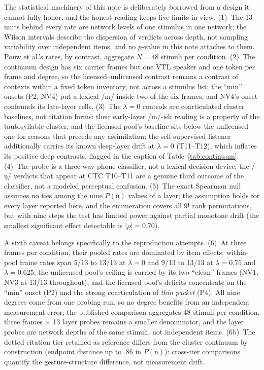 \documentclass[11pt,a4paper]{article}
\newcommand{\lam}{\lambda}
\begin{document}
The statistical machinery of this note is deliberately borrowed from a
design it cannot fully honor, and the honest reading keeps five
limits in view. (1)~The 13 units behind every rate are network levels
of one stimulus in one network; the Wilson intervals describe the
dispersion of verdicts across depth, not sampling variability over
independent items, and no $p$-value in this note attaches to them.
Pouw et al.'s rates, by contrast, aggregate $N = 48$ stimuli per
condition. (2)~The continuum design has six carrier frames but one
VTL speaker and one token per frame and degree, so the
licensed--unlicensed contrast remains a contrast of contexts within a
fixed token inventory, not across a stimulus list; the ``min'' onsets
(P2, NV4) put a lexical /m/ inside two of the six frames, and NV4's
onset confounds its late-layer cells. (3)~The $\lam=0$ controls are
coarticulated cluster baselines, not citation forms: their early-layer
/m/-ish reading is a property of the tautosyllabic cluster, and the
licensed pool's baseline sits below the unlicensed one for reasons
that precede any assimilation; the self-supervised listener
additionally carries its known deep-layer drift at $\lam=0$
(T11--T12), which inflates its positive deep contrasts, flagged in
the caption of Table~\ref{tab:continuum}. (4)~The probe is
a three-way phone classifier, not a lexical decision device; the
/ŋ/ verdicts that appear at CTC T10--T11 are a genuine third
outcome of the classifier, not a modeled perceptual confusion.
(5)~The exact Spearman null assumes no ties among the nine
$P(\mathrm{n})$ values of a layer; the assumption holds for every
layer reported here, and the enumeration covers all $9!$ rank
permutations, but with nine steps the test has limited power against
partial monotone drift (the smallest significant effect detectable is
$|\rho| = 0.70$).

A sixth caveat belongs specifically to the reproduction attempts.
(6)~At three frames per condition, their pooled rates are dominated by
item effects: within-pool frame rates span 5/13 to 13/13 at $\lam=0$
and 9/13 to 13/13 at $\lam=0.75$ and $\lam=0.625$, the unlicensed
pool's ceiling is carried by its two ``clean'' frames (NV1, NV3 at
13/13 throughout), and the licensed pool's deficits concentrate on
the ``min'' onset (P2) and the strong coarticulation of \emph{thin
packet} (P4). All nine degrees come from one probing run, so no
degree benefits from an independent measurement error; the published
comparison aggregates 48 stimuli per condition, three frames
$\times$ 13 layer probes remains a smaller denominator, and the layer
probes are network depths of the same stimuli, not independent
items. (6b)~The dotted citation tier retained as reference differs
from the cluster continuum by construction (endpoint distance up to
$.86$ in $P(\mathrm{n})$): cross-tier comparisons quantify the
gesture-structure difference, not measurement drift.
\end{document}
